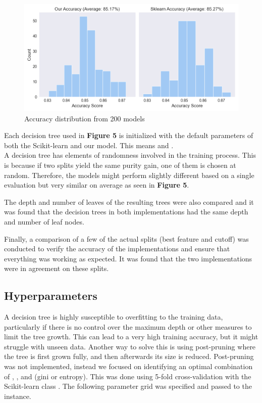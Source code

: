 \begin{figure}[H]
    \centering
    \includegraphics[scale=0.55]{figures_for_report/our_vs_sklearn_accuracy}
    \captionsetup{justification=centering,margin=2cm}
    \caption{Accuracy distribution from 200 models}
\end{figure}

Each decision tree used in \textbf{Figure 5} is initialized with the default parameters of both the Scikit-learn and our model.
This means  and . \\

A decision tree has elements of randomness involved in the training process.
This is because if two splits yield the same purity gain, one of them is chosen at random.
Therefore, the models might perform slightly different based on a single evaluation but very similar on average as seen in \textbf{Figure 5}.
\newline

The depth and number of leaves of the resulting trees were also compared and it was found that the decision trees in both implementations had the same depth and number of leaf nodes.
\newline

Finally, a comparison of a few of the actual splits (best feature and cutoff) was conducted to verify the accuracy of the implementations and ensure that everything was working as expected.
It was found that the two implementations were in agreement on these splits.

\subsection{Hyperparameters}
A decision tree is highly susceptible to overfitting to the training data, particularly if there is no control over the maximum depth or other measures to limit the tree growth.
This can lead to a very high training accuracy, but it might struggle with unseen data.
Another way to solve this is using post-pruning where the tree is first grown fully, and then afterwards its size is reduced.
Post-pruning was not implemented, instead we focused on identifying an optimal combination of , , and  (gini or entropy).
This was done using 5-fold cross-validation with the Scikit-learn class .
The following parameter grid was specified and passed to the  instance.
\newline

